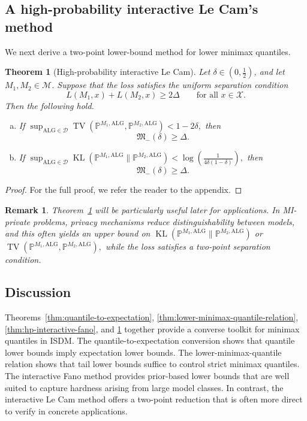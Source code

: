 \documentclass[journal]{IEEEtran}
\newtheorem{theorem}{Theorem}
\newtheorem{remark}{Remark}
\newcommand{\ALG}{\mathrm{ALG}}
\newcommand{\TV}{\operatorname{TV}}
\newcommand{\KL}{\operatorname{KL}}
\begin{document}
\subsection{A high-probability interactive Le Cam's method}

We next derive a two-point lower-bound method for lower minimax quantiles. 

\begin{theorem}[High-probability interactive Le Cam]
\label{thm:hp-lecam}
Let \(\delta\in(0,\tfrac12)\), and let \(M_1,M_2\in\mathcal M\). Suppose that the loss satisfies the uniform separation condition
\[
L(M_1,x)+L(M_2,x)\ge 2\Delta
\qquad
\text{for all }x\in\mathcal X.
\]
Then the following hold.
\begin{enumerate}[(a)]
    \item If 
    $\sup_{\ALG\in\mathcal D}
    \TV(\mathbb P^{M_1,\ALG},\mathbb P^{M_2,\ALG})<1-2\delta,
    $
    then
    \[
    \mathfrak M_{-}(\delta)\ge \Delta.
    \]

    \item If 
    $\sup_{\ALG\in\mathcal D}
    \KL(\mathbb P^{M_1,\ALG}\|\mathbb P^{M_2,\ALG})
    <
    \log\!\left(\frac{1}{4\delta(1-\delta)}\right),
    $
    then
    \[
    \mathfrak M_{-}(\delta)\ge \Delta.
    \]
\end{enumerate}
\end{theorem}
\begin{proof}[Proof] For the full proof, we refer the reader to the appendix.
\end{proof}

\begin{remark}
    Theorem~\ref{thm:hp-lecam} will be particularly useful later for applications. In MI-private problems, privacy mechanisms reduce distinguishability between models, and this often yields an upper bound on
\(
\KL(\mathbb P^{M_1,\ALG}\|\mathbb P^{M_2,\ALG})
\)
or
\(
\TV(\mathbb P^{M_1,\ALG},\mathbb P^{M_2,\ALG}),
\)
while the loss satisfies a two-point separation condition.
\end{remark}


\subsection{Discussion}

Theorems~\ref{thm:quantile-to-expectation}, \ref{thm:lower-minimax-quantile-relation}, \ref{thm:hp-interactive-fano}, and \ref{thm:hp-lecam} together provide a converse toolkit for minimax quantiles in ISDM. The quantile-to-expectation conversion shows that quantile lower bounds imply expectation lower bounds. The lower-minimax-quantile relation shows that tail lower bounds suffice to control strict minimax quantiles. The interactive Fano method provides prior-based lower bounds that are well
suited to capture hardness arising from large model classes. In contrast, the
interactive Le Cam method offers a two-point reduction that is often more direct
to verify in concrete applications.
\end{document}

